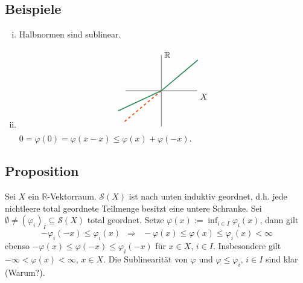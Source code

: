 \subsection[Beispiele für sublineare Abbildungen]{Beispiele} %
\label{sub:218}
\begin{enumerate}[(i)]
	\item Halbnormen sind sublinear.
	\item \[
		\begin{tikzpicture}[scale=0.5]
			\draw (-3,0) -- (3,0) node[below right]{$X$};
			\draw (0,-3) -- (0,3) node[right]{$\mathds{R}$};
			\draw[very thick, dashed,OrangeRed2] (0,0) -- (220:4);
			\draw[very thick,SeaGreen4] (40:4) -- (0,0) -- (205:4);
		\end{tikzpicture}
	\]
	$0 = \varphi(0) = \varphi(x-x) \le \varphi(x) + \varphi(-x)$.
\end{enumerate}

\subsection[Proposition: Die sublinearen Abbildungen $\mathcal{S}(X)$ sind nach unten induktiv geordnet]{Proposition} %
\label{sub:219}
Sei $X$ ein $\mathds{R}$-Vektorraum. $\mathcal{S}(X)$ ist nach unten induktiv geordnet, d.h. jede nichtleere total geordnete Teilmenge besitzt eine untere Schranke.
Sei $\emptyset \not= (\varphi_i)_{I} \subseteq \mathcal{S}(X)$ total geordnet. Setze $\varphi(x) := \inf_{i \in I} \varphi_i(x)$, dann gilt 
\[
	- \varphi_i(-x) \le \varphi_i(x) \enspace\Longrightarrow \enspace- \varphi(x) \le \varphi(x) \le \varphi_i(x) < \infty
\]
ebenso $-\varphi(x) \le \varphi(-x) \le \varphi_i(-x)$ für $x \in X$, $i \in I$. Insbesondere gilt $- \infty <  \varphi(x) < \infty$, $x \in X$. 
Die Sublinearität von $\varphi$ und $\varphi \le \varphi_i$, $i \in I$ sind klar (Warum?). \bewende

